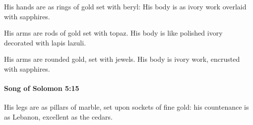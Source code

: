 			\begin{versebox}
					\item[BHS] 
					\item[LXX] 
					\item[ASV] His hands are as rings of gold set with beryl: His body is as ivory work overlaid with sapphires.
					\item[NIV] His arms are rods of gold set with topaz. His body is like polished ivory decorated with lapis lazuli.
					\item[NRSV] His arms are rounded gold, set with jewels. His body is ivory work, encrusted with sapphires.
			\end{versebox}

		\paragraph{Song of Solomon 5:15} %
			\label{SONGOFSOLOMON-5-15}

			His legs are as pillars of marble, set upon sockets of fine gold: his countenance is as Lebanon, excellent as the cedars.

